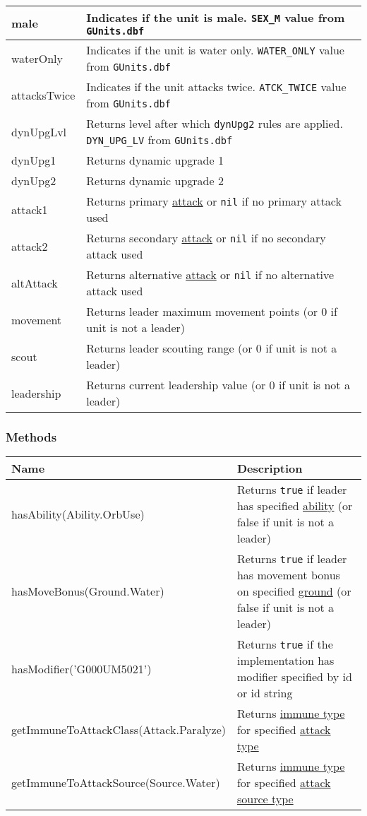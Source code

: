 \begin{center}
\begin{tabularx}{\linewidth}{| l | X |}
\hline
male & Indicates if the unit is male. \texttt{SEX\_M} value from \texttt{GUnits.dbf}\\
\hline
waterOnly & Indicates if the unit is water only. \texttt{WATER\_ONLY} value from \texttt{GUnits.dbf}\\
\hline
attacksTwice & Indicates if the unit attacks twice. \texttt{ATCK\_TWICE} value from \texttt{GUnits.dbf}\\
\hline
dynUpgLvl & Returns level after which \texttt{dynUpg2} rules are applied. \texttt{DYN\_UPG\_LV} from \texttt{GUnits.dbf}\\
\hline
dynUpg1 & Returns dynamic upgrade 1\\
\hline
dynUpg2 & Returns dynamic upgrade 2\\
\hline
attack1 & Returns primary \hyperref[Attack]{attack} or \texttt{nil} if no primary attack used\\
\hline
attack2 & Returns secondary \hyperref[Attack]{attack} or \texttt{nil} if no secondary attack used\\
\hline
altAttack & Returns alternative \hyperref[Attack]{attack} or \texttt{nil} if no alternative attack used\\
\hline
movement & Returns leader maximum movement points (or 0 if unit is not a leader)\\
\hline
scout & Returns leader scouting range (or 0 if unit is not a leader)\\
\hline
leadership & Returns current leadership value (or 0 if unit is not a leader)\\
\hline
\end{tabularx}
\end{center}
\subsubsection{Methods}
\begin{center}
\begin{tabularx}{\linewidth}{| l | X |}
\hline
\textbf{Name} & \textbf{Description} \\
\hline
hasAbility(Ability.OrbUse) & Returns \texttt{true} if leader has specified \hyperref[AbilityCategory]{ability} (or false if unit is not a leader)\\
\hline
hasMoveBonus(Ground.Water) & Returns \texttt{true} if leader has movement bonus on specified \hyperref[GroundCategory]{ground} (or false if unit is not a leader)\\
\hline
hasModifier('G000UM5021') & Returns \texttt{true} if the implementation has modifier specified by id or id string\\
\hline
getImmuneToAttackClass(Attack.Paralyze) & Returns \hyperref[ImmuneCategory]{immune type} for specified \hyperref[AttackCategory]{attack type}\\
\hline
getImmuneToAttackSource(Source.Water) & Returns \hyperref[ImmuneCategory]{immune type} for specified \hyperref[SourceCategory]{attack source type}\\
\hline
\end{tabularx}
\end{center}